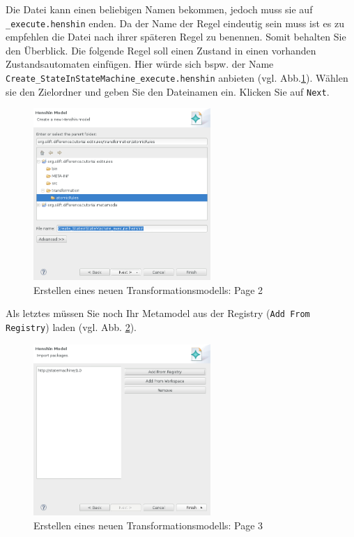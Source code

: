 Die Datei kann einen beliebigen Namen bekommen, jedoch muss sie auf \texttt{\_execute.henshin} enden.
Da der Name der Regel eindeutig sein muss ist es zu empfehlen die Datei nach ihrer späteren Regel zu benennen. Somit behalten Sie den Überblick.
Die folgende Regel soll einen Zustand in einen vorhanden Zustandsautomaten einfügen. Hier würde sich bspw. der Name \texttt{Create\_StateInStateMachine\_execute.henshin} anbieten (vgl. Abb.\ref{henshin-create_henshin_model_page02}).
Wählen sie den Zielordner und geben Sie den Dateinamen ein.
Klicken Sie auf \texttt{Next}.

\begin{figure}[H]
\centering
\includegraphics[width=0.6\textwidth]{editrules/graphics/henshin-create_henshin_model_page02.png}
\caption{Erstellen eines neuen Transformationsmodells: Page 2}
\label{henshin-create_henshin_model_page02}
\end{figure}

Als letztes müssen Sie noch Ihr Metamodel aus der Registry (\texttt{Add From Registry}) laden (vgl. Abb. \ref{henshin-create_henshin_model_page03}).

\begin{figure}[H]
\centering
\includegraphics[width=0.6\textwidth]{editrules/graphics/henshin-create_henshin_model_page03.png}
\caption{Erstellen eines neuen Transformationsmodells: Page 3}
\label{henshin-create_henshin_model_page03}
\end{figure}

